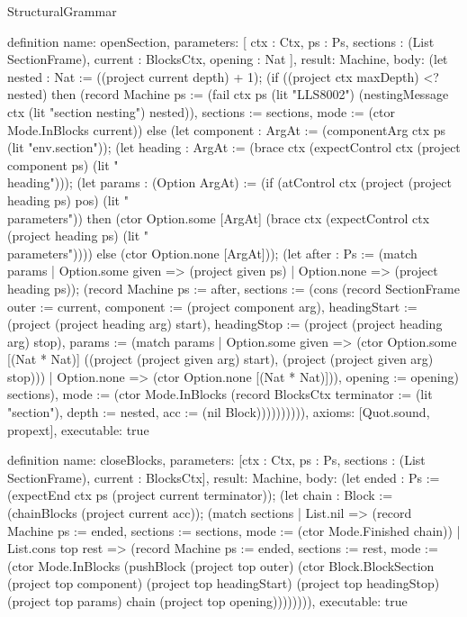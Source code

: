 \begin{lexlean}{StructuralGrammar}
\begin{semanticmodule}
{{definition{
  name: openSection,
  parameters: [
    ctx : Ctx,
    ps : Ps,
    sections : (List SectionFrame),
    current : BlocksCtx,
    opening : Nat
  ],
  result: Machine,
  body: (let nested : Nat := ((project current depth) + 1); (if ((project ctx maxDepth) <? nested) then (record Machine {ps := (fail ctx ps (lit "LLS8002") (nestingMessage ctx (lit "section nesting") nested)), sections := sections, mode := (ctor Mode.InBlocks current)}) else (let component : ArgAt := (componentArg ctx ps (lit "env.section")); (let heading : ArgAt := (brace ctx (expectControl ctx (project component ps) (lit "\\heading"))); (let params : (Option ArgAt) := (if (atControl ctx (project (project heading ps) pos) (lit "\\parameters")) then (ctor Option.some [ArgAt] (brace ctx (expectControl ctx (project heading ps) (lit "\\parameters")))) else (ctor Option.none [ArgAt])); (let after : Ps := (match params
    | Option.some given => (project given ps)
    | Option.none => (project heading ps)); (record Machine {ps := after, sections := (cons (record SectionFrame {outer := current, component := (project component arg), headingStart := (project (project heading arg) start), headingStop := (project (project heading arg) stop), params := (match params
    | Option.some given => (ctor Option.some [(Nat * Nat)] ((project (project given arg) start), (project (project given arg) stop)))
    | Option.none => (ctor Option.none [(Nat * Nat)])), opening := opening}) sections), mode := (ctor Mode.InBlocks (record BlocksCtx {terminator := (lit "section"), depth := nested, acc := (nil Block)}))}))))))),
  axioms: [Quot.sound, propext],
  executable: true
}

definition{
  name: closeBlocks,
  parameters: [ctx : Ctx, ps : Ps, sections : (List SectionFrame), current : BlocksCtx],
  result: Machine,
  body: (let ended : Ps := (expectEnd ctx ps (project current terminator)); (let chain : Block := (chainBlocks (project current acc)); (match sections
    | List.nil => (record Machine {ps := ended, sections := sections, mode := (ctor Mode.Finished chain)})
    | List.cons top rest => (record Machine {ps := ended, sections := rest, mode := (ctor Mode.InBlocks (pushBlock (project top outer) (ctor Block.BlockSection (project top component) (project top headingStart) (project top headingStop) (project top params) chain (project top opening))))})))),
  executable: true
}

}}
\end{semanticmodule}
\end{lexlean}
